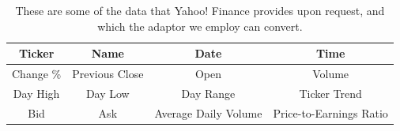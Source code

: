 \begin{table}
\label{financeparams}
\centering
\renewcommand\arraystretch{1.5}
\begin{tabular}{|c|c|c|c|}
\hline
Ticker & Name & Date & Time \\
\hline
Change \% & Previous Close & Open & Volume \\
\hline
Day High & Day Low & Day Range & Ticker Trend \\
\hline
Bid & Ask & Average Daily Volume & Price-to-Earnings Ratio \\
\hline
\end{tabular}
\caption{These are some of the data that Yahoo! Finance provides upon request, and which the adaptor we employ
can convert.}
\end{table}
%
\fi
%
%

